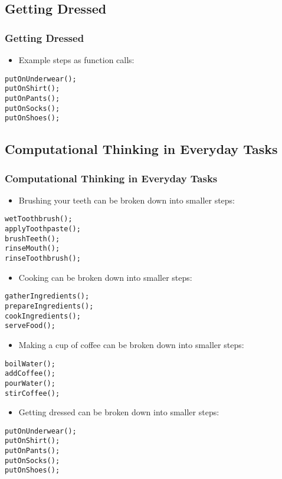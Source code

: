 \subsection{Getting Dressed}
\begin{frame}[fragile]
\frametitle{Getting Dressed}
\begin{itemize}
    \item Example steps as function calls:
\end{itemize}
\begin{verbatim}
putOnUnderwear();
putOnShirt();
putOnPants();
putOnSocks();
putOnShoes();
\end{verbatim}
\end{frame}

\subsection{Computational Thinking in Everyday Tasks}
\begin{frame}[fragile]
\frametitle{Computational Thinking in Everyday Tasks}
\begin{itemize}
    \item Brushing your teeth can be broken down into smaller steps:
\end{itemize}
\begin{verbatim}
wetToothbrush();
applyToothpaste();
brushTeeth();
rinseMouth();
rinseToothbrush();
\end{verbatim}
\begin{itemize}
    \item Cooking can be broken down into smaller steps:
\end{itemize}
\begin{verbatim}
gatherIngredients();
prepareIngredients();
cookIngredients();
serveFood();
\end{verbatim}
\begin{itemize}
    \item Making a cup of coffee can be broken down into smaller steps:
\end{itemize}
\begin{verbatim}
boilWater();
addCoffee();
pourWater();
stirCoffee();
\end{verbatim}
\begin{itemize}
    \item Getting dressed can be broken down into smaller steps:
\end{itemize}
\begin{verbatim}
putOnUnderwear();
putOnShirt();
putOnPants();
putOnSocks();
putOnShoes();
\end{verbatim}
\end{frame}
